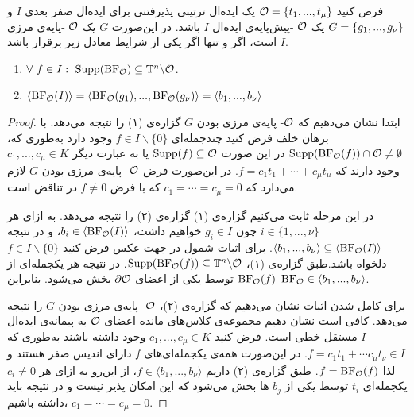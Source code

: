 \begin{proposition}
فرض کنید 
${\mathcal O} = \{t_{1},...,t_{\mu}\}$
یک ایده‌ال ترتیبی پذیرفتنی برای ایده‌ال صفر بعدی 
$I$
و
$G = \{g_{1},...,g_{\nu}\}$
یک 
${\mathcal O}$
-پیش‌پایه‌ی ایده‌ال 
$I$
باشد. در این‌صورت 
$G$
یک 
${\mathcal O}$
-پایه‌ی مرزی 
$I$
است، اگر و تنها اگر یکی از شرایط معادل زیر برقرار باشد.
\begin{enumerate}
\item
$\fa \ f\in I: \ \Supp(\bof_{\mO})\subseteq \tn\backslash \mO$.
\item
$\langle\operatorname{\mathrm{BF}}_{{\mathcal O}}(I)\rangle = \langle \operatorname{\mathrm{BF}}_{{\mathcal O}}(g_{1}),...,\operatorname{\mathrm{BF}}_{{\mathcal O}}(g_{\nu}) \rangle = \langle b_{1},...,b_{\nu}\rangle$
\end{enumerate}
\end{proposition}
\begin{proof}
ابتدا نشان می‌دهیم که 
${\mathcal O}$-
پایه‌ی مرزی بودن 
$G$
گزاره‌ی (۱) را نتیجه می‌دهد. با برهان خلف فرض کنید چندجمله‌ای 
$f\in I\backslash\{0\}$
وجود دارد به‌طوری که، 
$\operatorname{\mathrm{Supp}}(\operatorname{\mathrm{BF}}_{{\mathcal O}}(f))\cap{\mathcal O} \neq \emptyset$
در این صورت 
$\operatorname{\mathrm{Supp}}(f)\subseteq {\mathcal O}$
یا به عبارت دیگر 
$c_{1},...,c_{\mu}\in K$
وجود دارند که 
$f = c_{1}t_{1} +\cdots+ c_{\mu}t_{\mu}$.
در این‌صورت فرض 
${\mathcal O}$-
پایه‌ی مرزی بودن 
$G$
لازم می‌دارد که 
$c_{1} = \cdots = c_{\mu} = 0$
که با فرض 
$f\neq 0$
در تناقض است. 

در این مرحله ثابت می‌کنیم گزاره‌ی (۱) گزاره‌ی (۲) را نتیجه می‌دهد. به ازای هر 
$i\in \{1,...,\nu\}$
چون 
$g_{i}\in I$
خواهیم داشت، 
$b_{i}\in \langle \operatorname{\mathrm{BF}}_{{\mathcal O}}(I) \rangle$،
و در نتیجه 
$\langle b_{1},...,b_{\nu}\rangle \subseteq \langle \operatorname{\mathrm{BF}}_{{\mathcal O}}(I)\rangle$.
برای اثبات شمول در جهت عکس فرض کنید 
$f\in I\backslash \{0\}$
دلخواه باشد.طبق گزاره‌ی (۱)،
$\operatorname{\mathrm{Supp}}(\operatorname{\mathrm{BF}}_{{\mathcal O}}(f))\subseteq {\mathbb{T}}^{n}\backslash {\mathcal O}$.
در نتیجه هر یکجمله‌ای از 
$\operatorname{\mathrm{BF}}_{{\mathcal O}}(f)$
توسط یکی از اعضای 
$\partial\mathcal{O}$
بخش می‌شود. بنابراین 
$\operatorname{\mathrm{BF}}_{{\mathcal O}}\in \langle b_{1},...,b_{\nu} \rangle$.

برای کامل شدن اثبات نشان می‌دهیم که گزاره‌ی (۲)، 
${\mathcal O}$-
پایه‌ی مرزی بودن 
$G$
را نتیجه می‌دهد. کافی است نشان دهیم مجموعه‌ی  کلاس‌های مانده اعضای 
${\mathcal O}$
به پیمانه‌ی ایده‌ال 
$I$
مستقل خطی است. فرض کنید 
$c_{1},...,c_{\mu}\in K$
وجود داشته باشند به‌طوری که 
$f = c_{1}t_{1}+\cdots c_{\mu}t_{\nu}\in I$.
در این‌صورت همه‌ی یکجمله‌ای‌های 
$f$
دارای اندیس صفر هستند و لذا 
$f = \operatorname{\mathrm{BF}}_{{\mathcal O}}(f)$.
طبق گزاره‌ی (۲) داریم 
$f\in \langle b_{1},...,b_{\nu}\rangle$،
از این‌رو به ازای هر 
$c_{i}\neq 0$
یکجمله‌ای 
$t_{i}$
توسط یکی از 
$b_{j}$
ها بخش می‌شود که این امکان پذیر نیست و در نتیجه باید داشته باشیم،
$c_{1} =\cdots = c_{\mu} = 0$.
\end{proof}

